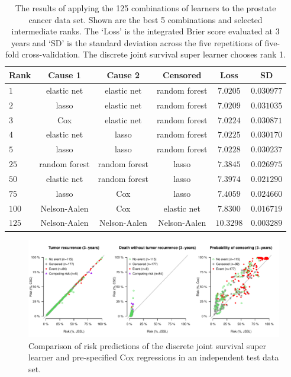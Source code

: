 \documentclass[alpha-refs]{wiley-article}
\newcommand{\1}{\mathds{1}}
\begin{document}
\begin{table}[ht]
  \caption{The results of applying the 125 combinations of learners to
the prostate cancer data set. Shown are the best 5 combinations and
selected intermediate ranks.  The `Loss' is the integrated Brier
score evaluated at 3 years and `SD' is the standard deviation
across the five repetitions of five-fold cross-validation. The discrete
joint survival super learner chooses rank 1. }
\begin{center}  
\begin{tabular}{ l| c c c c c } 
  Rank&Cause 1&Cause 2&Censored&Loss&SD \\\hline
  $   1 $&elastic net&elastic net&random forest&$  7.0205 $&$ 0.030977 $ \\
  $   2 $&lasso&elastic net&random forest&$  7.0209 $&$ 0.031035 $ \\
  $   3 $&Cox&elastic net&random forest&$  7.0224 $&$ 0.030871 $ \\
  $   4 $&elastic net&lasso&random forest&$  7.0225 $&$ 0.030170 $ \\
  $   5 $&lasso&lasso&random forest&$  7.0228 $&$ 0.030237 $ \\
  $  25 $&random forest&random forest&lasso&$  7.3845 $&$ 0.026975 $ \\
  $  50 $&elastic net&random forest&lasso&$  7.3974 $&$ 0.021290 $ \\
  $  75 $&lasso&Cox&lasso&$  7.4059 $&$ 0.024660 $ \\
  $ 100 $&Nelson-Aalen&Cox&elastic net&$  7.8300 $&$ 0.016719 $ \\
  $ 125 $&Nelson-Aalen&Nelson-Aalen&Nelson-Aalen&$ 10.3298 $&$ 0.003289 $ \\
\end{tabular}\label{tab:1}
\end{center}
\end{table}


\begin{figure}[ht]
  \includegraphics[width=14cm]{risks_zelefsky_single.pdf}
 \caption{Comparison of risk predictions of the discrete joint
   survival super learner and pre-specified Cox regressions in an
   independent test data set.}
\label{fig:zelefski-real}
\end{figure}
\end{document}
